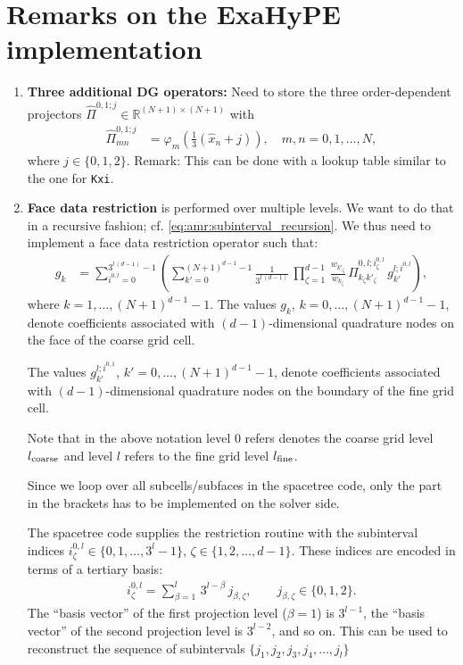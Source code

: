 \documentclass{scrreprt}
\theoremstyle{definition}
\theoremstyle{nonumberplain}
\begin{document}
\section{Remarks on the ExaHyPE implementation}
\begin{enumerate}
  \item \textbf{Three additional DG operators:} Need to store the three
  order-dependent projectors $\hat{\Pi}^{0,1;j}\in\mathbb{R}^{(N+1)\times(N+1)}$
with
\begin{align}
\hat{\Pi}^{0,1;j}_{mn}
&=
\varphi_m \left( \frac{1}{3} (\hat{x}_n+j)\right),
\quad m,n=0,1,\ldots,N,
\end{align}
where $j\in\{0,1,2\}$.
Remark: This can be done with a lookup table similar to the one for \texttt{Kxi}.
\item \textbf{Face data restriction} is performed over multiple levels. 
We want to do that in a recursive fashion; cf.
\eqref{eq:amr:subinterval_recursion}.
We thus
need to implement a face data restriction operator such that:
\begin{align}
g_k &=
\sum_{i^{0,l}=0}^{3^{l\,(d-1)}-1}
\left(
\sum_{k'=0}^{(N+1)^{d-1}-1}
\frac{1}{3^{l\,(d-1)}}\,
\prod_{\zeta=1}^{d-1}\,
\frac{w_{k'_\zeta}}{w_{k_\zeta}}\,
\hat{\Pi}^{0,l;i^{0,l}_\zeta}_{k_\zeta k'_\zeta}
\,
g^{l;i^{0,l}}_{k'}
\right)
,
\end{align}
where $k=1,\ldots,(N+1)^{d-1}-1$.
The values $g_{k}$, $k=0,\ldots,(N+1)^{d-1}-1$, denote coefficients
associated with $(d-1)$-dimensional quadrature nodes on the face
of the coarse grid cell.

The values $g^{l;i^{0,1}}_{k'}$, $k'=0,\ldots,(N+1)^{d-1}-1$, denote
coefficients associated with $(d-1)$-dimensional quadrature nodes on the boundary
of the fine grid cell. 

Note that in the above notation level 0 refers
denotes the coarse grid level $l_\textup{coarse}$ and level $l$ refers to
the fine grid level $l_\textup{fine}$.

Since we loop over all subcells/subfaces in
the spacetree code, only the part in
the brackets has to be implemented on the solver side.

The spacetree code supplies the restriction
routine with the subinterval indices
$i^{0,l}_\zeta\in\{0,1,\ldots,3^l-1\}$, $\zeta\in\{1,2,\ldots,d-1\}$. 
These indices are encoded 
in terms of a tertiary basis:
\begin{align}
\label{eq:ader_impl:amr:subinterval_index}
i^{0,l}_\zeta = \sum_{\beta=1}^{l}\,3^{l-\beta}\,j_{\beta,\zeta},\qquad
j_{\beta,\zeta} \in \{ 0, 1, 2 \}.
\end{align}
The ``basis vector'' of the first projection level ($\beta=1$) is $3^{l-1}$,
the ``basis vector'' of the second projection level is
$3^{l-2}$, and so on.
This can be used to
reconstruct the sequence of subintervals
$\{j_1,j_2,j_3,j_4,\ldots,j_l\}$


\end{enumerate}
\end{document}
